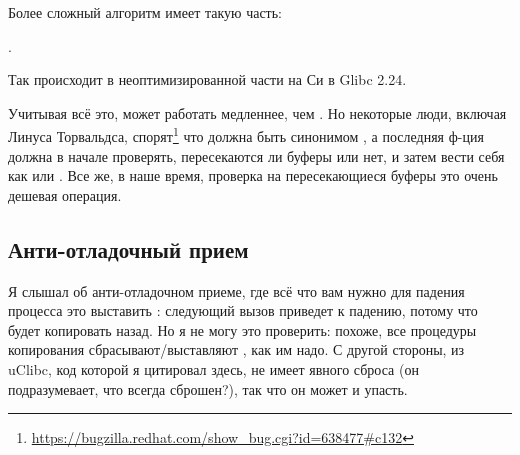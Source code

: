 Более сложный алгоритм имеет такую часть:

.

Так происходит в неоптимизированной части на Си в Glibc 2.24.

Учитывая всё это,  может работать медленнее, чем .
Но некоторые люди, включая Линуса Торвальдса, спорят\footnote{\url{https://bugzilla.redhat.com/show_bug.cgi?id=638477\#c132}}
что  должна быть синонимом , а последняя ф-ция должна в начале проверять,
пересекаются ли буферы или нет, и затем вести себя как  или .
Все же, в наше время, проверка на пересекающиеся буферы это очень дешевая операция.

\subsection{Анти-отладочный прием}

Я слышал об анти-отладочном приеме, где всё что вам нужно для падения процесса это выставить : следующий вызов
 приведет к падению, потому что будет копировать назад.
Но я не могу это проверить: похоже, все процедуры копирования сбрасывают/выставляют , как им надо.
С другой стороны,  из uClibc, код которой я цитировал здесь,
не имеет явного сброса  (он подразумевает, что  всегда сброшен?),
так что он может и упасть.

